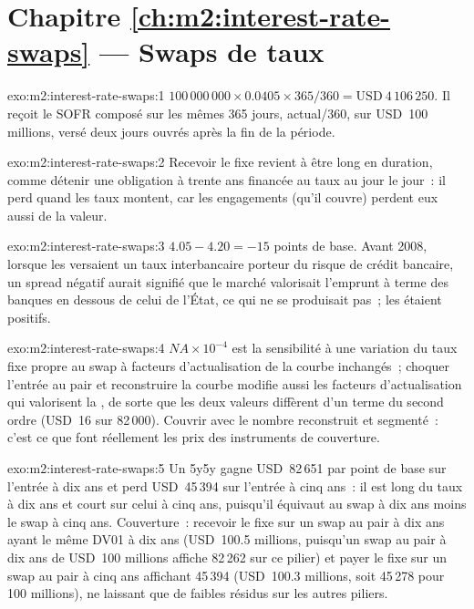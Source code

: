 \section*{Chapitre \ref{ch:m2:interest-rate-swaps} --- Swaps de taux}

\begin{solution}{exo:m2:interest-rate-swaps:1}
$100\,000\,000 \times 0.0405 \times 365/360 = \text{USD}~4\,106\,250$. Il reçoit le SOFR
composé sur les mêmes 365 jours, actual/360, sur USD~100 millions, versé deux
jours ouvrés après la fin de la période.
\end{solution}

\begin{solution}{exo:m2:interest-rate-swaps:2}
Recevoir le fixe revient à être long en duration, comme détenir une obligation à trente ans financée au
taux au jour le jour~: il perd quand les taux montent, car les engagements
(qu'il couvre) perdent eux aussi de la valeur.
\end{solution}

\begin{solution}{exo:m2:interest-rate-swaps:3}
$4.05 - 4.20 = -15$ points de base. Avant 2008, lorsque les  versaient un
taux interbancaire porteur du risque de crédit bancaire, un spread négatif aurait signifié que
le marché valorisait l'emprunt à terme des banques en dessous de celui de l'État, ce qui ne
se produisait pas~; les  étaient positifs.
\end{solution}

\begin{solution}{exo:m2:interest-rate-swaps:4}
$N A \times 10^{-4}$ est la sensibilité à une variation du taux fixe propre au swap
à facteurs d'actualisation de la courbe inchangés~; choquer l'entrée au pair et reconstruire
la courbe modifie aussi les facteurs d'actualisation qui valorisent la , de sorte que les deux
valeurs diffèrent d'un terme du second ordre (USD~16 sur 82\,000). Couvrir avec le nombre reconstruit et segmenté~:
c'est ce que font réellement les prix des instruments de couverture.
\end{solution}

\begin{solution}{exo:m2:interest-rate-swaps:5}
Un  5y5y gagne USD~82\,651 par point de base sur l'entrée à dix ans et perd
USD~45\,394 sur l'entrée à cinq ans~: il est long du taux à dix ans et court sur celui à cinq ans,
puisqu'il équivaut au swap à dix ans moins le swap à cinq ans. Couverture~: recevoir le fixe sur
un swap au pair à dix ans ayant le même DV01 à dix ans (USD~100.5 millions, puisqu'un
swap au pair à dix ans de USD~100 millions affiche 82\,262 sur ce pilier) et payer le fixe
sur un swap au pair à cinq ans affichant 45\,394 (USD~100.3 millions, soit 45\,278 pour 100
millions), ne laissant que de faibles résidus sur les autres piliers.
\end{solution}

